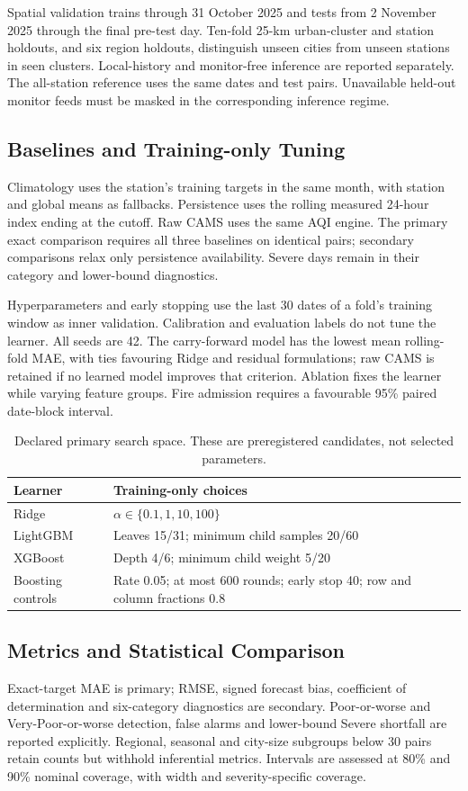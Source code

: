 Spatial validation trains through 31 October 2025 and tests from 2 November
2025 through the final pre-test day. Ten-fold 25-km urban-cluster and station
holdouts, and six region holdouts, distinguish unseen cities from unseen
stations in seen clusters. Local-history and monitor-free inference are
reported separately. The all-station reference uses the same dates and test
pairs. Unavailable held-out monitor feeds must be masked in the corresponding
inference regime.

\subsection{Baselines and Training-only Tuning}
Climatology uses the station's training targets in the same month, with
station and global means as fallbacks. Persistence uses the rolling measured
24-hour index ending at the cutoff. Raw CAMS uses the same AQI engine.
The primary exact comparison requires all three baselines on identical pairs;
secondary comparisons relax only persistence availability. Severe days remain
in their category and lower-bound diagnostics.

Hyperparameters and early stopping use the last 30 dates of a fold's training
window as inner validation. Calibration and evaluation labels do not tune the
learner. All seeds are 42. The carry-forward model has the lowest mean
rolling-fold MAE, with ties favouring Ridge and residual formulations; raw
CAMS is retained if no learned model improves that criterion. Ablation fixes
the learner while varying feature groups. Fire admission requires a favourable
95\% paired date-block interval.
\begin{table}[t]\centering\footnotesize
\caption{Declared primary search space. These are preregistered candidates, not selected parameters.}
\label{tab:search}
\setlength{\tabcolsep}{4pt}
\begin{tabular}{lp{}}
\toprule
Learner & Training-only choices\\\midrule
Ridge & $\alpha\in\{0.1,1,10,100\}$\\
LightGBM & Leaves 15/31; minimum child samples 20/60\\
XGBoost & Depth 4/6; minimum child weight 5/20\\
Boosting controls & Rate 0.05; at most 600 rounds; early stop 40; row and column fractions 0.8\\
\bottomrule\end{tabular}
\end{table}
\subsection{Metrics and Statistical Comparison}
Exact-target MAE is primary; RMSE, signed forecast bias, coefficient of
determination and six-category diagnostics are secondary. Poor-or-worse and
Very-Poor-or-worse detection, false alarms and lower-bound Severe shortfall
are reported explicitly. Regional, seasonal and city-size subgroups below
30 pairs retain counts but withhold inferential metrics. Intervals are assessed
at 80\% and 90\% nominal coverage, with width and severity-specific coverage.

